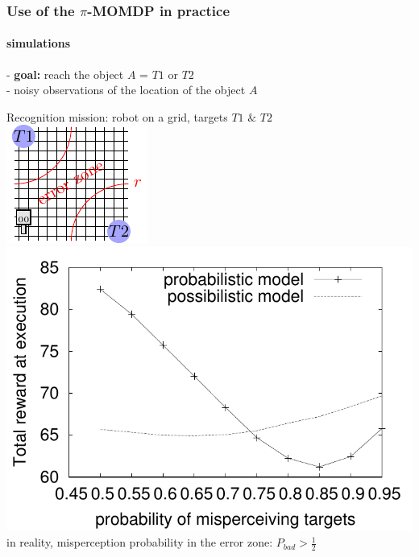 \documentclass[12pt,svgnames,table]{beamer}
\newcommand{\paren}[1]{\left( \left. #1 \right. \right)}
\newcommand{\sachant}{\, \right| \left. \,}
\begin{document}
\begin{frame}
\frametitle{Use of the $\pi$-MOMDP in practice}
\framesubtitle{\footnotesize simulations}

- \textbf{goal:} reach the object $A$ = $T1$ or $T2$ \\
- noisy observations of the location of the object $A$%
\begin{exampleblock}{Recognition mission: robot on a grid, targets $T1$ $\&$ $T2$}
\includegraphics[width=.45\linewidth]{robotgrid.pdf} 
\includegraphics[width=.55\linewidth]{courbe1.pdf}\\
in reality, misperception probability in the error zone: $P_{bad} > \frac{1}{2}$
\end{exampleblock}

\end{frame}
\end{document}
